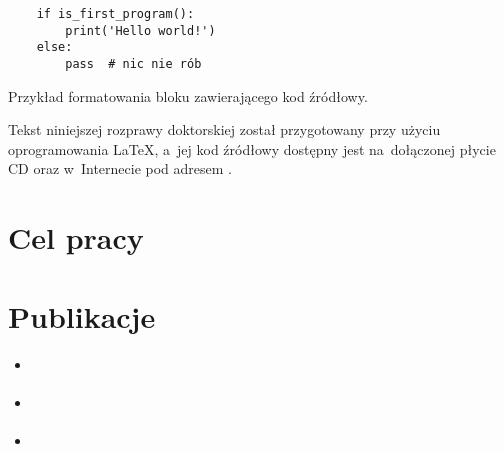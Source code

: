 \begin{listing}
  \begin{lstlisting}
    if is_first_program():
        print('Hello world!')
    else:
        pass  # nic nie rób
  \end{lstlisting}
\caption{Przykład formatowania bloku zawierającego kod źródłowy.}
\label{lst:example}
\end{listing}

Tekst niniejszej rozprawy doktorskiej został przygotowany przy użyciu oprogramowania \LaTeX,
  a~jej kod źródłowy dostępny jest na~dołączonej płycie CD oraz w~Internecie pod adresem \repourl{}.

\section{Cel pracy}\label{intro:goal}

\section{Publikacje}\label{intro:publications}
\begin{itemize}
  \item \cite{wieclaw21}
  \item \cite{stecko18}
  \item \cite{wieclaw22}
\end{itemize}

